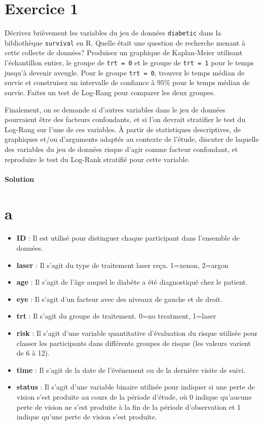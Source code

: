 \documentclass[../main.tex]{subfiles}
\begin{document}
\begin{CJK*}{UTF8}{gbsn}
\section*{Exercice 1}
Décrivez brièvement les variables du jeu de données 
\texttt{diabetic} dans la bibliothèque \texttt{survival} en R.
Quelle était une question de recherche menant à cette collecte de données?
Produisez un graphique de Kaplan-Meier utilisant l'échantillon entier,
le groupe de \texttt{trt = 0} et le groupe de \texttt{trt = 1} 
pour le temps jusqu'à devenir aveugle.
Pour le groupe \texttt{trt = 0}, trouvez le temps médian de survie et
construisez un intervalle de confiance à $95\%$ pour le temps médian de survie.
Faites un test de Log-Rang pour comparer les deux groupes.

Finalement, on se demande si d'autres variables
dans le jeu de données pourraient être des facteurs confondants, et si l'on devrait stratifier le
test du Log-Rang sur l'une de ces variables. À partir de statistiques descriptives, de graphiques
et/ou d'arguments adaptés au contexte de l'étude, discuter de laquelle des variables du jeu de
données risque d'agir comme facteur confondant, et reproduire le test du Log-Rank stratifié pour cette variable.

\paragraph{Solution}
\section{a}
\begin{itemize}
  \item \textbf{ID} : Il est utilisé pour distinguer chaque participant dans l'ensemble de données.
  \item \textbf{laser} : Il s'agit du type de traitement laser reçu. 1=xenon, 2=argon
  \item \textbf{age} : Il s'agit de l'âge auquel le diabète a été diagnostiqué chez le patient.
  \item \textbf{eye} : Il s'agit d'un facteur avec des niveaux de gauche et de droit.
  \item \textbf{trt} : Il s'agit du groupe de traitement. 0=no treatment, 1=laser
  \item \textbf{risk} : Il s'agit d'une variable quantitative d'évaluation du risque utilisée pour classer les participants dans différents groupes de risque (les valeurs varient de 6 à 12).
  \item \textbf{time} : Il s'agit de la date de l'événement ou de la dernière visite de suivi.
  \item \textbf{status} : Il s'agit d'une variable binaire utilisée pour indiquer si une perte de vision s'est produite au cours de la période d'étude, où 0 indique qu'aucune perte de vision ne s'est produite à la fin de la période d'observation et 1 indique qu'une perte de vision s'est produite.
\end{itemize}


\end{CJK*}
\end{document}
